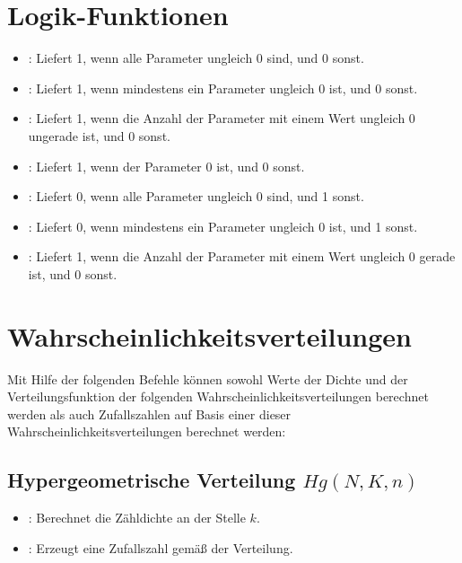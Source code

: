 \chapter{Logik-Funktionen}

\begin{itemize}

\item
{}:
Liefert 1, wenn alle Parameter ungleich 0 sind, und 0 sonst.

\item
{}:
Liefert 1, wenn mindestens ein Parameter ungleich 0 ist, und 0 sonst.

\item
{}:
Liefert 1, wenn die Anzahl der Parameter mit einem Wert ungleich 0 ungerade ist, und 0 sonst.

\item
{}:
Liefert 1, wenn der Parameter 0 ist, und 0 sonst.

\item
{}:
Liefert 0, wenn alle Parameter ungleich 0 sind, und 1 sonst.

\item
{}:
Liefert 0, wenn mindestens ein Parameter ungleich 0 ist, und 1 sonst.

\item
{}:
Liefert 1, wenn die Anzahl der Parameter mit einem Wert ungleich 0 gerade ist, und 0 sonst.

\end{itemize}



\chapter{Wahrscheinlichkeitsverteilungen}\label{sec:Wahrscheinlichkeitsverteilungen}

Mit Hilfe der folgenden Befehle können sowohl Werte der Dichte und der Verteilungsfunktion
der folgenden Wahrscheinlichkeitsverteilungen berechnet werden als auch Zufallszahlen
auf Basis einer dieser Wahrscheinlichkeitsverteilungen berechnet werden:


\section{Hypergeometrische Verteilung \texorpdfstring{$Hg(N,K,n)$}{Hg(N,K,n)}}

\begin{itemize}

\item
{}:
Berechnet die Zähldichte an der Stelle $k$.

\item
{}:
Erzeugt eine Zufallszahl gemäß der Verteilung.

\end{itemize}



